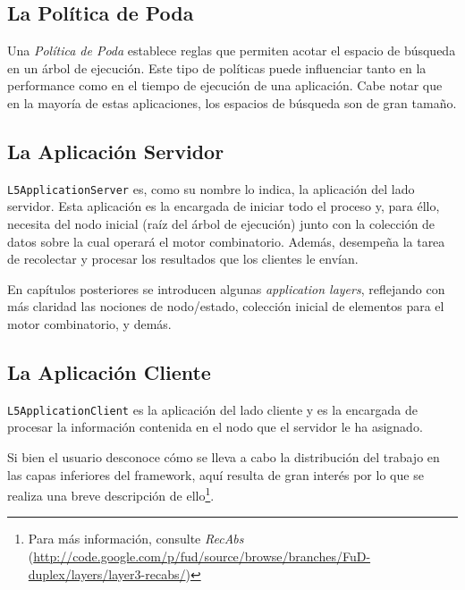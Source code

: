         \subsection{La Pol\'itica de Poda}
            Una \textit{Pol\'itica de Poda} establece reglas que permiten acotar el espacio de b\'usqueda en un \'arbol de ejecuci\'on. Este tipo de pol\'iticas 
            puede influenciar tanto en la performance como en el tiempo de ejecuci\'on de una aplicaci\'on. Cabe notar que en la mayor\'ia de estas
            aplicaciones, los espacios de b\'usqueda son de gran tama\~no.

        \subsection{La Aplicaci\'on Servidor}
            \texttt{L5ApplicationServer} es, como su nombre lo indica, la aplicaci\'on del lado servidor. Esta aplicaci\'on es la encargada de iniciar todo el
            proceso y, para \'ello, necesita del nodo inicial (ra\'iz del \'arbol de ejecuci\'on) junto con la colecci\'on de datos sobre la cual operar\'a el 
            motor combinatorio. Adem\'as, desempe\~na la tarea de recolectar y procesar los resultados que los clientes le env\'ian.
            
            En cap\'itulos posteriores se introducen algunas \textit{application layers}, reflejando con m\'as claridad las nociones de nodo/estado, 
            colecci\'on inicial de elementos para el motor combinatorio, y dem\'as.
            
        \subsection{La Aplicaci\'on Cliente}
			\texttt{L5ApplicationClient} es la aplicaci\'on del lado cliente y es la encargada de procesar la informaci\'on contenida en el nodo que el servidor 
			le ha asignado. 
			
			Si bien el usuario desconoce c\'omo se lleva a cabo la distribuci\'on del trabajo en las capas inferiores del framework, aqu\'i resulta de gran 
      inter\'es por lo que se realiza una breve descripci\'on de ello\footnote{Para m\'as informaci\'on, consulte \textit{RecAbs}
      (\url{http://code.google.com/p/fud/source/browse/branches/FuD-duplex/layers/layer3-recabs/})}.
			
